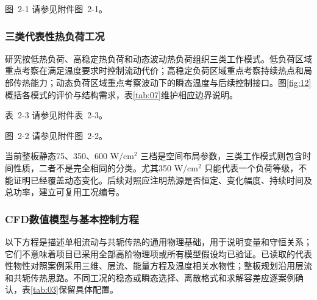 \documentclass[UTF8]{midterm}
\makeatletter
\newcommand{\submissionnumber}[1]{\def\@currentlabel{#1}}
\makeatother
\begin{document}
\par\noindent \begingroup\submissionnumber{2-1a}\label{fig:05}\endgroup \begingroup\submissionnumber{2-1b}\label{fig:06}\endgroup \begingroup\submissionnumber{2-1}\label{fig:05-06}\endgroup 图~2-1 请参见附件图~2-1。\par




\subsubsection{三类代表性热负荷工况}
研究按低热负荷、高稳定热负荷和动态波动热负荷组织三类工作模式。低负荷区域重点考察在满足温度要求时控制流动代价；高稳定负荷区域重点考察持续热点和局部传热能力；动态负荷区域重点考察波动下的瞬态温度与后续控制接口。图\ref{fig:12}概括各模式的评价与结构需求，表\ref{tab:07}维护相应边界说明。

\par\noindent \begingroup\submissionnumber{2-3}\label{tab:07}\endgroup 表~2-3 请参见附件表~2-3。\par



\par\noindent \begingroup\submissionnumber{2-2}\label{fig:12}\endgroup 图~2-2 请参见附件图~2-2。\par

当前整板静态75、350、600 $\mathrm{W/cm^2}$ 三档是空间布局参数，三类工作模式则包含时间性质，二者不是完全相同的分类。尤其350 $\mathrm{W/cm^2}$ 只能代表一个负荷等级，不能证明已经覆盖动态变化。后续对照应注明热源是否恒定、变化幅度、持续时间及总功率，建立可复用工况编号。

\subsubsection{CFD数值模型与基本控制方程}
以下方程是描述单相流动与共轭传热的通用物理基础，用于说明变量和守恒关系；它们不意味着项目已采用全部高阶物理项或所有模型假设均已验证。已读取的代表性物性对照案例采用三维、层流、能量方程及温度相关水物性；整板规划沿用层流和共轭传热思路。不同工况的稳态或瞬态选择、离散格式和求解容差应逐案例确认，表\ref{tab:03}保留具体配置。
\end{document}
